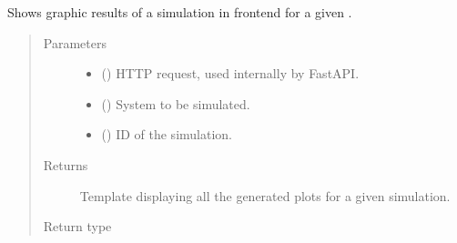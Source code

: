 \documentclass[a4paper,landscape,10pt,english]{sphinxmanual}
\begin{document}
\begin{fulllineitems}
\label{\detokenize{code_docs/simulation_api.controller:simulation_api.controller.main.results_sim_system_sim_id}}
Shows graphic results of a simulation in frontend for a given .
\begin{quote}\begin{description}
\item[{Parameters}] \leavevmode\begin{itemize}
\item {} 
 () \textendash{} HTTP request, used internally by FastAPI.

\item {} 
 ({\hyperref[\detokenize{code_docs/simulation_api.controller:simulation_api.controller.schemas.SimSystem}]{}}) \textendash{} System to be simulated.

\item {} 
 () \textendash{} ID of the simulation.

\end{itemize}

\item[{Returns}] \leavevmode
Template displaying all the generated plots for a given simulation.

\item[{Return type}] \leavevmode
{}

\end{description}\end{quote}

\end{fulllineitems}
\end{document}
